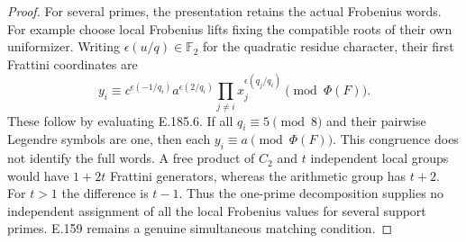\begin{proof}
For several primes, the presentation retains the actual
Frobenius words. For example choose local Frobenius lifts
fixing the compatible roots of their own uniformizer.
Writing \(\epsilon(u/q)\in\mathbb F_2\) for the quadratic
residue character, their first Frattini coordinates are
\[
 y_i\equiv c^{\epsilon(-1/q_i)}
       a^{\epsilon(2/q_i)}
       \prod_{j\ne i}x_j^{\epsilon(q_j/q_i)}
                         \pmod{\Phi(F)}.
 \tag{E.185.10}
\]
These follow by evaluating E.185.6. If all \(q_i\equiv5\pmod8\)
and their pairwise Legendre symbols are one, then each
\(y_i\equiv a\pmod{\Phi(F)}\). This congruence does not
identify the full words. A free product of \(C_2\) and
\(t\) independent local groups would have \(1+2t\)
Frattini generators, whereas the arithmetic group has
\(t+2\). For \(t>1\) the difference is \(t-1\).
Thus the one-prime decomposition supplies no independent
assignment of all the local Frobenius values for several
support primes. E.159 remains a genuine simultaneous
matching condition.
\end{proof}
